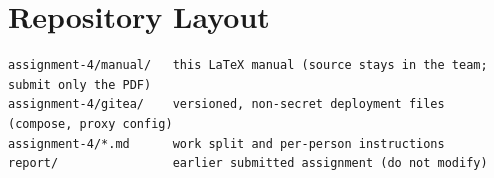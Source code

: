 \section{Repository Layout}
\begin{verbatim}
assignment-4/manual/   this LaTeX manual (source stays in the team; submit only the PDF)
assignment-4/gitea/    versioned, non-secret deployment files (compose, proxy config)
assignment-4/*.md      work split and per-person instructions
report/                earlier submitted assignment (do not modify)
\end{verbatim}
